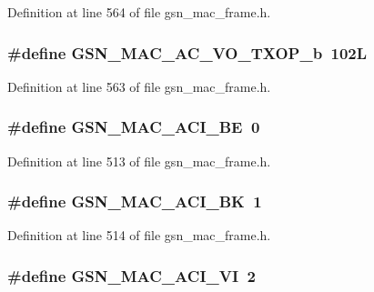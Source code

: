 Definition at line 564 of file gsn\_\-mac\_\-frame.h.

\hypertarget{a00523_aa4dd2c48cf49dc7c2650714c32bdb1cd}{
\subsubsection[{GSN\_\-MAC\_\-AC\_\-VO\_\-TXOP\_\-b}]{\setlength{\rightskip}{0pt plus 5cm}\#define GSN\_\-MAC\_\-AC\_\-VO\_\-TXOP\_\-b~102L}}
\label{a00523_aa4dd2c48cf49dc7c2650714c32bdb1cd}


Definition at line 563 of file gsn\_\-mac\_\-frame.h.

\hypertarget{a00523_a883b55372dade601837db81c6f59bdd7}{
\subsubsection[{GSN\_\-MAC\_\-ACI\_\-BE}]{\setlength{\rightskip}{0pt plus 5cm}\#define GSN\_\-MAC\_\-ACI\_\-BE~0}}
\label{a00523_a883b55372dade601837db81c6f59bdd7}


Definition at line 513 of file gsn\_\-mac\_\-frame.h.

\hypertarget{a00523_a97a58aa6ea6e5a9bed57639a304055c0}{
\subsubsection[{GSN\_\-MAC\_\-ACI\_\-BK}]{\setlength{\rightskip}{0pt plus 5cm}\#define GSN\_\-MAC\_\-ACI\_\-BK~1}}
\label{a00523_a97a58aa6ea6e5a9bed57639a304055c0}


Definition at line 514 of file gsn\_\-mac\_\-frame.h.

\hypertarget{a00523_a532c477c2671eb5baf4b3bbdf44ed128}{
\subsubsection[{GSN\_\-MAC\_\-ACI\_\-VI}]{\setlength{\rightskip}{0pt plus 5cm}\#define GSN\_\-MAC\_\-ACI\_\-VI~2}}
\label{a00523_a532c477c2671eb5baf4b3bbdf44ed128}


